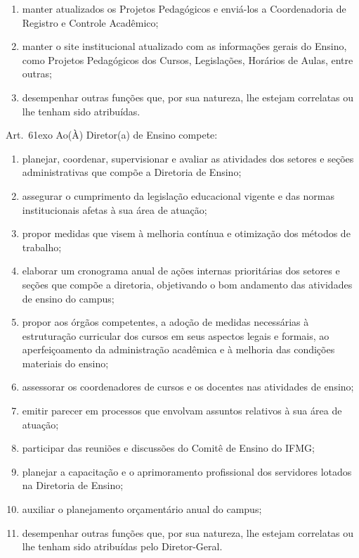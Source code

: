 \documentclass[a4paper,12pt]{report}
\newcommand{\ORD}[2]{#1\raise1ex\hbox{\scriptsize#2}}
\begin{document}
\begin{enumerate}
\item manter atualizados os Projetos Pedagógicos e enviá-los a Coordenadoria de Registro e Controle Acadêmico;

\item manter o site institucional atualizado com as informações gerais do Ensino, como Projetos Pedagógicos dos Cursos, Legislações, Horários de Aulas, entre outras;

\item desempenhar outras funções que, por sua natureza, lhe estejam correlatas ou lhe tenham sido atribuídas.
\end{enumerate}
 
Art.~\ORD{6}{o} Ao(À) Diretor(a) de Ensino compete:

\begin{enumerate}
\renewcommand{\labelenumi}{\Roman{enumi}}

\item planejar, coordenar, supervisionar e avaliar as atividades dos setores e seções
      administrativas que compõe a Diretoria de Ensino;

\item assegurar o cumprimento da legislação educacional vigente e das normas institucionais       afetas à sua área de atuação;

\item propor medidas que visem à melhoria contínua e otimização dos métodos de trabalho;

\item elaborar um cronograma anual de ações internas prioritárias dos setores e seções que       compõe a diretoria, objetivando o bom andamento das atividades de ensino do campus;

\item propor aos órgãos competentes, a adoção de medidas necessárias à estruturação    
      curricular dos cursos em seus aspectos legais e formais, ao aperfeiçoamento da administração acadêmica e à melhoria das condições materiais do ensino;

\item assessorar os coordenadores de cursos e os docentes nas atividades de ensino;

\item emitir parecer em processos que envolvam assuntos relativos à sua área de atuação;

\item participar das reuniões e discussões do Comitê de Ensino do IFMG;

\item planejar a capacitação e o aprimoramento profissional dos servidores lotados na   
      Diretoria de Ensino;

\item auxiliar o planejamento orçamentário anual do campus;

\item desempenhar outras funções que, por sua natureza, lhe estejam correlatas ou lhe  
      tenham sido atribuídas pelo Diretor-Geral.
\end{enumerate}
\end{document}
